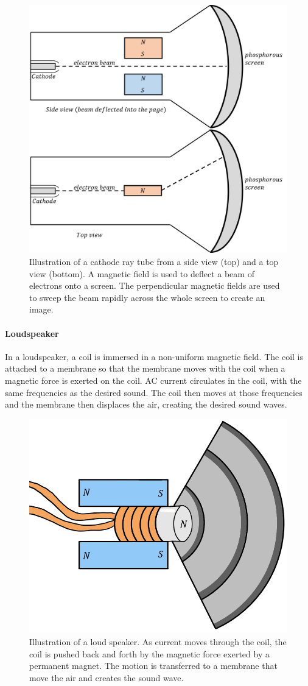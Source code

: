 \begin{figure}[!htbp]
\centering
\includegraphics[width=0.6\linewidth]{files/crt-97511c9399fef59cfc4ace3b6c9ba420.png}
\caption[]{Illustration of a cathode ray tube from a side view (top) and a top view (bottom). A magnetic field is used to deflect a beam of electrons onto a screen. The perpendicular magnetic fields are used to sweep the beam rapidly across the whole screen to create an image.}
\label{fig:magneticforce:crt}
\end{figure}

\paragraph{Loudspeaker}

In a loudspeaker, a coil is immersed in a non-uniform magnetic field. The coil is attached to a membrane so that the membrane moves with the coil when a magnetic force is exerted on the coil. AC current circulates in the coil, with the same frequencies as the desired sound. The coil then moves at those frequencies and the membrane then displaces the air, creating the desired sound waves.

\begin{figure}[!htbp]
\centering
\includegraphics[width=0.6\linewidth]{files/speaker-2732a20fcc5a641b167b5f7a3c7be97e.png}
\caption[]{Illustration of a loud speaker. As current moves through the coil, the coil is pushed back and forth by the magnetic force exerted by a permanent magnet. The motion is transferred to a membrane that move the air and creates the sound wave.}
\label{fig:magneticforce:speaker}
\end{figure}

